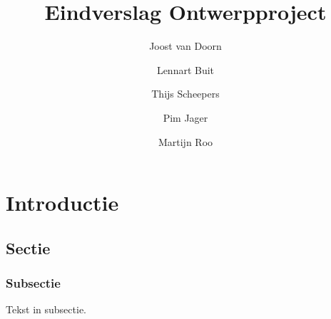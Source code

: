\documentclass[a4paper]{report}
\title{Eindverslag Ontwerpproject}
\date{}
\author{
	Joost van Doorn\\
	\and
	Lennart Buit\\
	\and
	Thijs Scheepers\\
	\and
	Pim Jager
	\and
	Martijn Roo\\
}
\begin{document}
\maketitle

\chapter{Introductie}
\section{Sectie}
\subsection{Subsectie}
Tekst in subsectie.


\newpage


\end{document}
